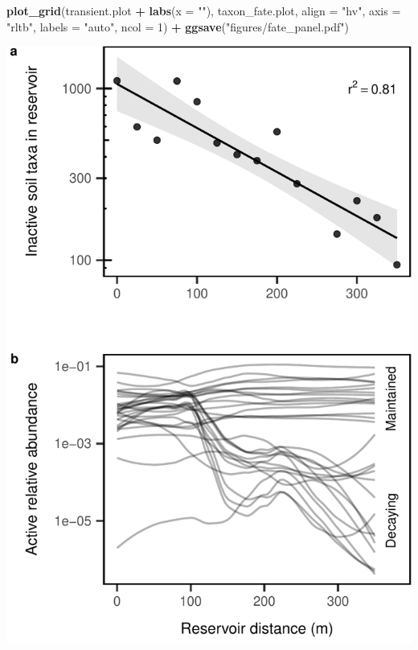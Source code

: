 \documentclass[]{article}
\newenvironment{Shaded}{\begin{snugshade}}{\end{snugshade}}
\newcommand{\DataTypeTok}[1]{\textcolor[rgb]{0.13,0.29,0.53}{#1}}
\newcommand{\DecValTok}[1]{\textcolor[rgb]{0.00,0.00,0.81}{#1}}
\newcommand{\KeywordTok}[1]{\textcolor[rgb]{0.13,0.29,0.53}{\textbf{#1}}}
\newcommand{\NormalTok}[1]{#1}
\newcommand{\OperatorTok}[1]{\textcolor[rgb]{0.81,0.36,0.00}{\textbf{#1}}}
\newcommand{\StringTok}[1]{\textcolor[rgb]{0.31,0.60,0.02}{#1}}
\begin{document}
\begin{Shaded}
\begin{Highlighting}[]
\KeywordTok{plot_grid}\NormalTok{(transient.plot }\OperatorTok{+}\StringTok{ }\KeywordTok{labs}\NormalTok{(}\DataTypeTok{x =} \StringTok{""}\NormalTok{),}
\NormalTok{          taxon_fate.plot,}
          \DataTypeTok{align =} \StringTok{"hv"}\NormalTok{, }\DataTypeTok{axis =} \StringTok{"rltb"}\NormalTok{,}
          \DataTypeTok{labels =} \StringTok{"auto"}\NormalTok{,}
          \DataTypeTok{ncol =} \DecValTok{1}\NormalTok{) }\OperatorTok{+}
\StringTok{  }\KeywordTok{ggsave}\NormalTok{(}\StringTok{"figures/fate_panel.pdf"}\NormalTok{)}
\end{Highlighting}
\end{Shaded}

\begin{center}\includegraphics{ReservoirGradient_files/figure-latex/fate_panel-1} \end{center}
\end{document}
